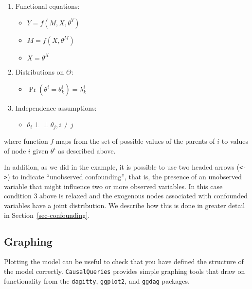 \documentclass[
  11pt,
  article]{jss}
\providecommand{\tightlist}{%
  \setlength{\itemsep}{0pt}\setlength{\parskip}{0pt}}\usepackage{longtable,booktabs,array}
\begin{document}
\begin{enumerate}
\def\labelenumi{\arabic{enumi}.}
\item
  Functional equations:

  \begin{itemize}
  \tightlist
  \item
    \(Y = f(M, X, \theta^Y)\)
  \item
    \(M = f(X, \theta^M)\)
  \item
    \(X = \theta^X\)
  \end{itemize}
\item
  Distributions on \(\Theta\):

  \begin{itemize}
  \tightlist
  \item
    \(\Pr(\theta^i = \theta^i_k) = \lambda^i_k\)
  \end{itemize}
\item
  Independence assumptions:\\

  \begin{itemize}
  \tightlist
  \item
    \(\theta_i \perp\!\!\! \perp \theta_j, i\neq j\)
  \end{itemize}
\end{enumerate}

where function \(f\) maps from the set of possible values of the parents
of \(i\) to values of node \(i\) given \(\theta^i\) as described above.

In addition, as we did in the \citet{chickering_clinicians_1996}
example, it is possible to use two headed arrows
(\texttt{\textless{}-\textgreater{}}) to indicate ``unobserved
confounding'', that is, the presence of an unobserved variable that
might influence two or more observed variables. In this case condition 3
above is relaxed and the exogenous nodes associated with confounded
variables have a joint distribution. We describe how this is done in
greater detail in Section~\ref{sec-confounding}.

\hypertarget{graphing}{%
\subsection{Graphing}\label{graphing}}

Plotting the model can be useful to check that you have defined the
structure of the model correctly. \texttt{CausalQueries} provides simple
graphing tools that draw on functionality from the \texttt{dagitty},
\texttt{ggplot2}, and \texttt{ggdag} packages.
\end{document}
